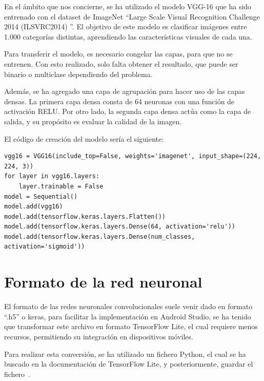 En el ámbito que nos concierne, se ha utilizado el modelo VGG-16 que ha sido entrenado con el dataset de ImageNet ``Large Scale Visual Recognition Challenge 2014 (ILSVRC2014) ''. El objetivo de este modelo es clasificar imágenes entre 1.000 categorías distintas, aprendiendo las características visuales de cada una. 

Para transferir el modelo, es necesario congelar las capas, para que no se entrenen. Con esto realizado, solo falta obtener el resultado, que puede ser binario o multiclase dependiendo del problema.

Además, se ha agregado una capa de agrupación para hacer uso de las capas densas. La primera capa densa consta de 64 neuronas con una función de activación RELU. Por otro lado, la segunda capa densa actúa como la capa de salida, y su propósito es evaluar la calidad de la imagen.

El código de creación del modelo sería el siguiente:

\begin{lstlisting}
vgg16 = VGG16(include_top=False, weights='imagenet', input_shape=(224, 224, 3))
for layer in vgg16.layers:
    layer.trainable = False
model = Sequential()
model.add(vgg16)
model.add(tensorflow.keras.layers.Flatten())
model.add(tensorflow.keras.layers.Dense(64, activation='relu'))
model.add(tensorflow.keras.layers.Dense(num_classes, activation='sigmoid'))

\end{lstlisting}

\section{Formato de la red neuronal}

El formato de las redes neuronales convolucionales suele venir dado en formato ``.h5'' o keras, para facilitar la implementación en Android Studio, se ha tenido que transformar este archivo en formato TensorFlow Lite, el cual requiere menos recursos, permitiendo su integración en dispositivos móviles.

Para realizar esta conversión, se ha utilizado un fichero Python, el cual se ha buscado en la documentación de TensorFlow Lite, y posteriormente, guardar el fichero~\cite{tensorflowliteConverter}.

